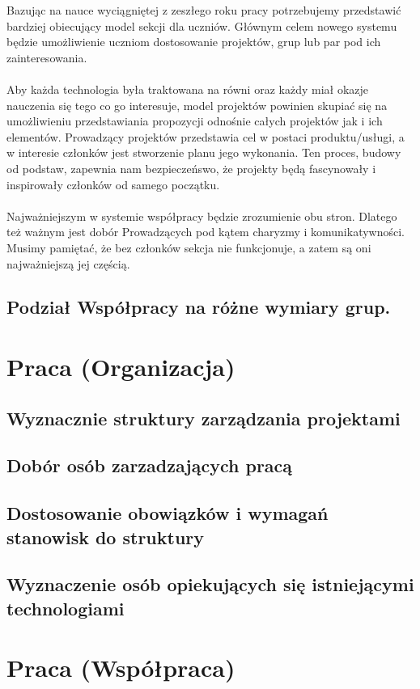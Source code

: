 \documentclass[9pt,a4paper]{report}
\begin{document}
Bazując na nauce wyciągniętej z zeszłego roku pracy potrzebujemy przedstawić bardziej obiecujący model sekcji dla uczniów. Głównym celem nowego systemu będzie umożliwienie uczniom dostosowanie projektów, grup lub par pod ich zainteresowania.\\\\
Aby każda technologia była traktowana na równi oraz każdy miał okazje nauczenia się tego co go interesuje, model projektów powinien skupiać się na umożliwieniu przedstawiania propozycji odnośnie całych projektów jak i ich elementów. Prowadzący projektów przedstawia cel w postaci produktu/usługi, a w interesie członków jest stworzenie planu jego wykonania. Ten proces, budowy od podstaw, zapewnia nam bezpieczeńswo, że projekty będą fascynowały i inspirowały członków od samego początku.\\\\
Najważniejszym w systemie współpracy będzie zrozumienie obu stron. Dlatego też ważnym jest dobór Prowadzących pod kątem charyzmy i komunikatywności. Musimy pamiętać, że bez członków sekcja nie funkcjonuje, a zatem są oni najważniejszą jej częścią.

\section{Podział Współpracy na różne wymiary grup.}


\chapter{Praca (Organizacja)}

\section{Wyznacznie struktury zarządzania projektami}
\section{Dobór osób zarzadzających pracą}
\section{Dostosowanie obowiązków i wymagań stanowisk do struktury}
\section{Wyznaczenie osób opiekujących się istniejącymi technologiami}

\chapter{Praca (Współpraca)}
\end{document}
